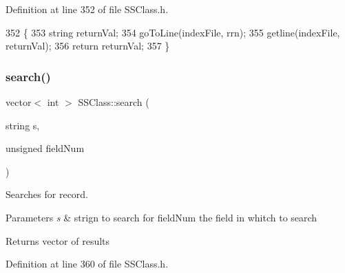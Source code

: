 Definition at line 352 of file S\+S\+Class.\+h.


\begin{DoxyCode}
352                                   \{
353     \textcolor{keywordtype}{string} returnVal;
354     goToLine(indexFile, rrn);
355     getline(indexFile, returnVal);
356     \textcolor{keywordflow}{return} returnVal;
357 \}
\end{DoxyCode}
\mbox{\label{classSSClass_a9df3598c000a6a5e9ef994d19196e69f}} 
\subsubsection{\texorpdfstring{search()}{search()}}
{\footnotesize\ttfamily vector$<$ int $>$ S\+S\+Class\+::search (\begin{DoxyParamCaption}\item[{string}]{s,  }\item[{unsigned}]{field\+Num }\end{DoxyParamCaption})}



Searches for record. 


\begin{DoxyParams}{Parameters}
{\em s} & strign to search for  field\+Num the field in whitch to search \\
\hline
\end{DoxyParams}
\begin{DoxyReturn}{Returns}
vector of results 
\end{DoxyReturn}


Definition at line 360 of file S\+S\+Class.\+h.


